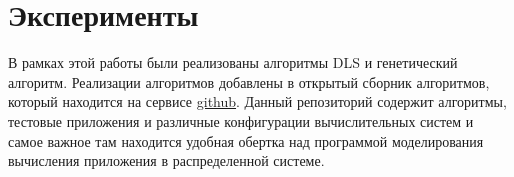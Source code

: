 \chapter*{Эксперименты}
\begin{spacing}{1.3}

В рамках этой работы были реализованы алгоритмы DLS и генетический алгоритм.  Реализации алгоритмов добавлены в открытый сборник алгоритмов, который находится на сервисе \href{https://github.com/rialeksandrov/pysimgrid/tree/master/pysimgrid/simdag/algorithms}{github}. Данный репозиторий содержит алгоритмы, тестовые приложения и различные конфигурации вычислительных систем и самое важное там находится удобная обертка над программой моделирования вычисления приложения в распределенной системе.

\end{spacing}